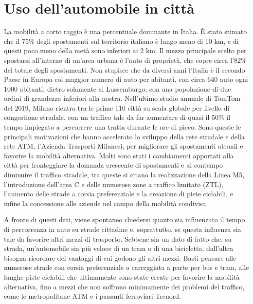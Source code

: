 \section{Uso dell'automobile in città}

La mobilità a corto raggio è una percentuale dominante in Italia. È stato stimato che il 75\% degli spostamenti sul territorio italiano è lungo meno di 10 km, e di questi poco meno della metà sono inferiori ai 2 km\cite{isfortaudimob}. Il mezzo principale scelto per spostarsi all'interno di un'area urbana è l'auto di proprietà, che copre circa l'82\% del totale degli spostamenti. Non stupisce che da diversi anni l'Italia è il secondo Paese in Europa col maggior numero di auto per abitanti, con circa 640 auto ogni 1000 abitanti\cite{eurostatcars}, dietro solamente al Lussemburgo, con una popolazione di due ordini di grandezza inferiori alla nostra. Nell'ultimo studio annuale di TomTom del 2019\cite{tomtomindexmilan}, Milano rientra tra le prime 110 città su scala globale per livello di congestione stradale, con un traffico tale da far aumentare di quasi il 50\% il tempo impiegato a percorrere una tratta durante le ore di picco. Sono queste le principali motivazioni che hanno accelerato lo sviluppo della rete stradale e della rete ATM, l'Azienda Trasporti Milanesi, per migliorare gli spostamenti attuali e favorire la mobilità alternativa. Molti sono stati i cambiamenti apportati alla città per fronteggiare la domanda crescente di spostamenti e al contempo diminuire il traffico stradale, tra queste si citano la realizzazione della Linea M5, l'introduzione dell'area C e delle numerose zone a traffico limitato (ZTL), l'aumento delle strade a corsia preferenziale e la creazione di piste ciclabili, e infine la concessione alle aziende nel campo della mobilità condivisa.

A fronte di questi dati, viene spontaneo chiedersi quanto sia influenzato il tempo di percorrenza in auto su strade cittadine e, soprattutto, se questa influenza sia tale da favorire altri mezzi di trasporto. Sebbene sia un dato di fatto che, su strada, un'automobile sia più veloce di un tram o di una bicicletta, dall'altra bisogna ricordare dei vantaggi di cui godono gli altri mezzi. Basti pensare alle numerose strade con corsia preferenziale o carreggiata a parte per bus e tram, alle lunghe piste ciclabili che ultimamente sono state create per favorire la mobilità alternativa, fino a mezzi che non soffrono minimamente dei problemi del traffico, come le metropolitane ATM e i passanti ferroviari Trenord.

